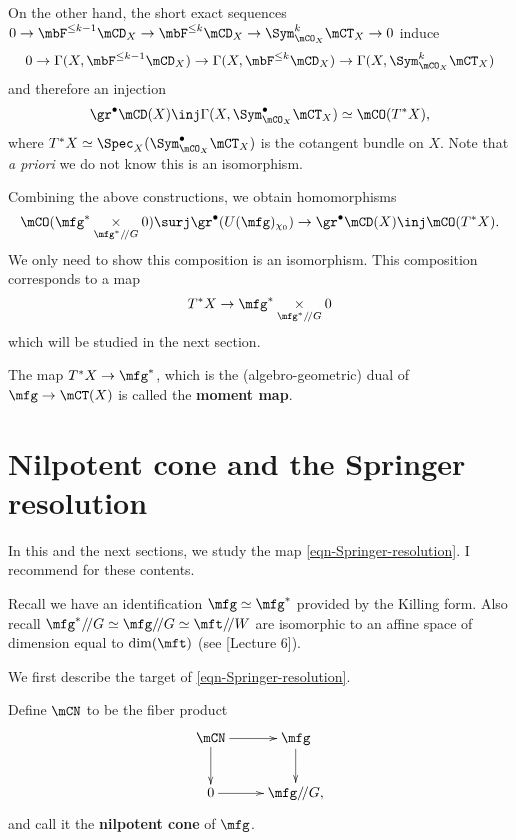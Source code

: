 	\begin{constr}
		On the other hand, the short exact sequences $0 \to \mbF^{\le k-1} \mCD_X \to  \mbF^{\le k} \mCD_X \to \Sym_{\mCO_X}^k \mCT_X \to 0$ induce 
		\[
			0 \to \Gamma(X, \mbF^{\le k-1} \mCD_X) \to \Gamma(X, \mbF^{\le k} \mCD_X) \to \Gamma(X,  \Sym_{\mCO_X}^k \mCT_X )
		\]
		and therefore an injection
		\[
			\gr^\bullet \mCD(X) \inj \Gamma(X,  \Sym_{\mCO_X}^\bullet \mCT_X ) \simeq \mCO(T^*X),
		\]
		where $T^*X \simeq \Spec_X( \Sym_{\mCO_X}^\bullet \mCT_X   )$ is the cotangent bundle on $X$. Note that \emph{a priori} we do not know this is an isomorphism.

	\end{constr}

	
	Combining the above constructions, we obtain homomorphisms
	\[
		\mCO( \mfg^*\mt_{\mfg^*/\!/G} 0 ) \surj \gr^\bullet (U(\mfg)_{\chi_0}) \to \gr^\bullet \mCD(X) \inj\mCO(T^*X).
	\]
	We only need to show this composition is an isomorphism. This composition corresponds to a map
	\begin{equation}
		\label{eqn-Springer-resolution}
		T^*X \to  \mfg^*\mt_{\mfg^*/\!/G} 0
	\end{equation}
	which will be studied in the next section.

	\begin{rem}
		The map $T^*X\to \mfg^*$, which is the (algebro-geometric) dual of $\mfg \to \mCT(X)$ is called the \textbf{moment map}.

	\end{rem}

\section{Nilpotent cone and the Springer resolution}
	
	In this and the next sections, we study the map \eqref{eqn-Springer-resolution}. I recommend \cite[Section 3]{CG} for these contents.


	Recall we have an identification $\mfg \simeq \mfg^*$ provided by the Killing form. Also recall $\mfg^*/\!/G\simeq \mfg/\!/G \simeq \mft/\!/W$ are isomorphic to an affine space of dimension equal to $\dim(\mft)$ (see [Lecture 6]).

	We first describe the target of \eqref{eqn-Springer-resolution}.

	\begin{defn}
		Define $\mCN$ to be the fiber product
		\[
			\xymatrix{
				\mCN \ar[r] \ar[d] & \mfg \ar[d] \\
				0 \ar[r] & \mfg/\!/G,
			}
		\]
		and call it the \textbf{nilpotent cone} of $\mfg$.
	\end{defn}


